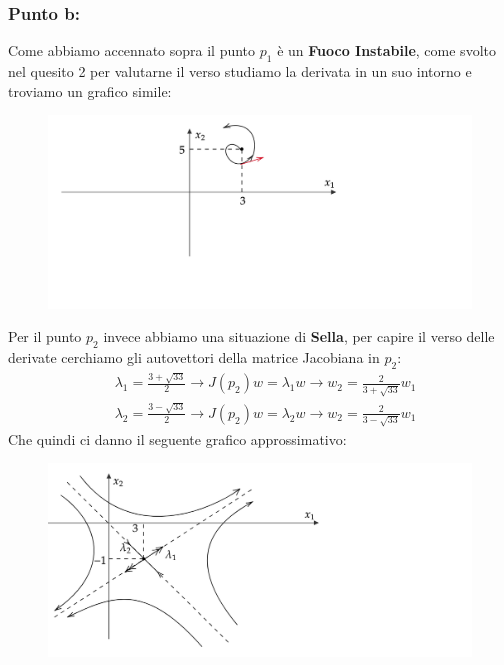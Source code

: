 \documentclass[a4paper]{report}
\begin{document}
\subsubsection*{Punto b:}
Come abbiamo accennato sopra il punto $p_1$ è un \textbf{Fuoco Instabile}, come svolto nel quesito 2 per valutarne il verso studiamo la derivata in un suo intorno e troviamo un grafico simile:
\begin{figure}[h]
\includegraphics[width=\textwidth]{eqp1}
\end{figure}\newline
Per il punto $p_2$ invece abbiamo una situazione di \textbf{Sella}, per capire il verso delle derivate cerchiamo gli autovettori della matrice Jacobiana in $p_2$:
\begin{align*}
&\lambda_1=\frac{3+\sqrt{33}}{2}\longrightarrow J(p_2)w=\lambda_1 w\longrightarrow w_2=\frac{2}{3+\sqrt{33}} w_1\\
&\lambda_2=\frac{3-\sqrt{33}}{2}\longrightarrow J(p_2)w=\lambda_2 w\longrightarrow w_2=\frac{2}{3-\sqrt{33}} w_1
\end{align*}
Che quindi ci danno il seguente grafico approssimativo:
\begin{figure}[h]
\includegraphics[width=\textwidth]{eqp2}
\end{figure}
\end{document}

